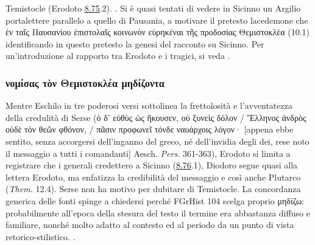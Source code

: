 {Temistocle  (Erodoto \href{http://data.perseus.org/citations/urn:cts:greekLit:tlg0016.tlg001.perseus-grc1:8.75}{8.75}.2). \cite[58]{Roux1974}. Si è quasi tentati di vedere in Sicinno un Argilio  portalettere parallelo a quello di Pausania, a motivare il pretesto lacedemone che \textgreek{ἐν ταῖς Παυσανίου ἐπιστολαῖς κοινωνὸν εὑρηκέναι τῆς προδοσίας Θεμιστοκλέα} (10.1) identificando in questo pretesto la genesi del racconto su Sicinno. Per un'introduzione al rapporto tra Erodoto e i tragici, si veda \cite{Griffin2006}.
\subsubsection{\textgreek{νομίσας τὸν Θεμιστοκλέα μηδίζοντα}}\label{temistoclemedizza}
Mentre Eschilo in tre poderosi versi sottolinea la frettolosità e l'avventatezza della credulità di Serse (\textgreek{ὁ δ’ εὐθὺς ὡς ἤκουσεν, οὐ ξυνεὶς δόλον / Ἕλληνος ἀνδρὸς οὐδὲ τὸν θεῶν φθόνον, / πᾶσιν προφωνεῖ τόνδε ναυάρχοις λόγον·} [appena ebbe sentito, senza accorgersi dell'inganno del greco, né dell'invidia degli dei, rese noto il  messaggio a tutti i comandanti] Aesch. \emph{Pers.} 361-363), Erodoto si limita a registrare che i generali credettero a Sicinno (\href{http://data.perseus.org/citations/urn:cts:greekLit:tlg0016.tlg001.perseus-grc1:8.76}{8.76}.1),  Diodoro segue quasi alla lettera Erodoto, ma enfatizza la credibilità del messaggio e così anche Plutarco (\emph{Them.}  12.4). Serse non ha motivo per dubitare di Temistocle. La concordanza generica delle fonti spinge a chiedersi perché FGrHist 104 scelga proprio \textgreek{μηδίζω}: probabilmente all'epoca della stesura del testo il termine era abbastanza diffuso e familiare, nonché molto adatto al contesto ed al periodo da un punto di vista retorico-stilistico. \cite[15-17 e 19]{Graf1984}. 
}
